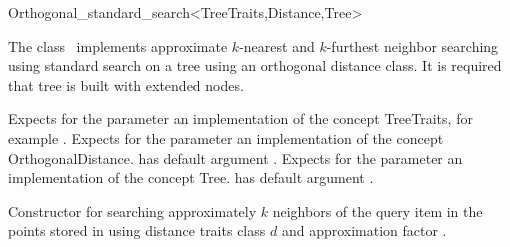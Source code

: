

\begin{ccRefClass}{Orthogonal_standard_search<TreeTraits,Distance,Tree>}  %


\ccDefinition

The class \ccRefName\ implements approximate $k$-nearest and $k$-furthest neighbor searching
using standard search on a  tree using an orthogonal distance
class. It is required that tree is built with extended nodes.


\ccParameters

Expects for the parameter  an implementation of the concept TreeTraits,
for example .
Expects for the parameter  an implementation of the
concept OrthogonalDistance.  has default argument 
.
Expects for the parameter  an implementation of the concept Tree.
 has default argument .


\ccTypes



\ccOperations

{Constructor for searching approximately $k$ neighbors of the query item  
in the points stored in  using 
distance
traits class $d$ and approximation factor .}


\end{ccRefClass}
